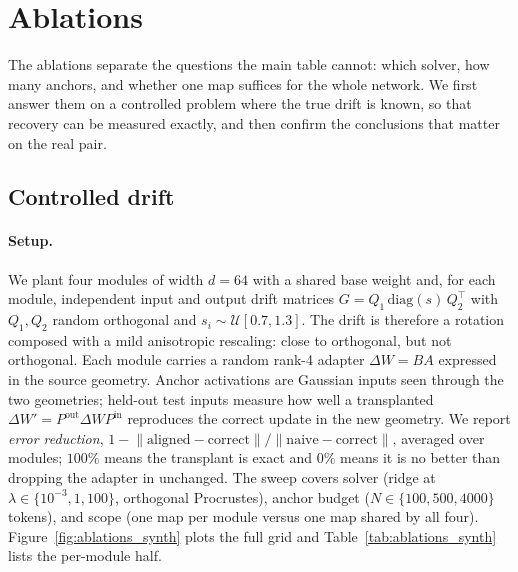 \section{Ablations}
\label{sec:ablations}

The ablations separate the questions the main table cannot: which solver, how
many anchors, and whether one map suffices for the whole network. We first
answer them on a controlled problem where the true drift is known, so that
recovery can be measured exactly, and then confirm the conclusions that matter
on the real pair.

\subsection{Controlled drift}
\label{sec:ablations:synth}

\paragraph{Setup.}
We plant four modules of width $d=64$ with a shared base weight and, for each
module, independent input and output drift matrices
$G=Q_1\,\mathrm{diag}(s)\,Q_2^\top$ with $Q_1,Q_2$ random orthogonal and
$s_i\sim\mathcal{U}[0.7,1.3]$. The drift is therefore a rotation composed
with a mild anisotropic rescaling: close to orthogonal, but not orthogonal.
Each module carries a random rank-4 adapter $\Delta W=BA$ expressed in the
source geometry. Anchor activations are Gaussian inputs seen through the two
geometries; held-out test inputs measure how well a transplanted
$\Delta W'=P^{\mathrm{out}}\Delta WP^{\mathrm{in}}$ reproduces the correct
update in the new geometry.
We report \emph{error reduction},
$1-\lVert\text{aligned}-\text{correct}\rVert/\lVert\text{naive}-\text{correct}\rVert$,
averaged over modules; $100\%$ means the transplant is exact and $0\%$ means it
is no better than dropping the adapter in unchanged. The sweep covers solver
(ridge at $\lambda\in\{10^{-3},1,100\}$, orthogonal Procrustes), anchor budget
($N\in\{100,500,4000\}$ tokens), and scope (one map per module versus one map
shared by all four). Figure~\ref{fig:ablations_synth} plots the full grid and
Table~\ref{tab:ablations_synth} lists the per-module half.

